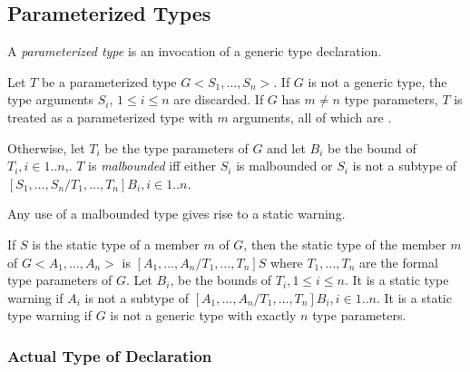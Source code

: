 \documentclass{article}
\begin{document}




\subsection{Parameterized Types}

\LMHash{}
A {\em parameterized type} is an invocation of a generic type declaration.

\LMHash{}
Let $T$ be a parameterized type  $G<S_1,  \ldots, S_n>$. If $G$ is not a generic type, the type arguments $S_i$, $1 \le i \le n$ are discarded. If $G$ has $m \ne n$ type parameters, $T$ is treated as a parameterized type with $m$ arguments, all of which are \DYNAMIC{}.


\LMHash{}
Otherwise, let
 $T_i$ be the type parameters of $G$ and let $B_i$ be the bound of $T_i,  i \in 1.. n$,. $T$ is {\em malbounded} iff either $S_i$ is malbounded  or $S_i$ is not a subtype of $[S_1,  \ldots, S_n/T_1, \ldots, T_n]B_i,   i \in 1.. n$.


\LMHash{}
Any use of a malbounded type gives rise to a static warning.

\LMHash{}
If $S$ is the static type of a member $m$ of $G$, then the static type of the member $m$ of  $G<A_1, \ldots, A_n>$  is $[A_1,  \ldots, A_n/T_1,  \ldots, T_n]S$ where $T_1,  \ldots, T_n$ are the formal type parameters of $G$.   Let $B_i$, be the bounds of $T_i, 1 \le i \le n$. It is a static type warning if $A_i$ is not a subtype of  $[A_1,  \ldots, A_n/T_1,  \ldots, T_n]B_i, i \in 1..n$. It is a static type warning if $G$ is not a generic type with exactly $n$ type parameters.





\subsubsection{Actual Type of Declaration}
\end{document}
